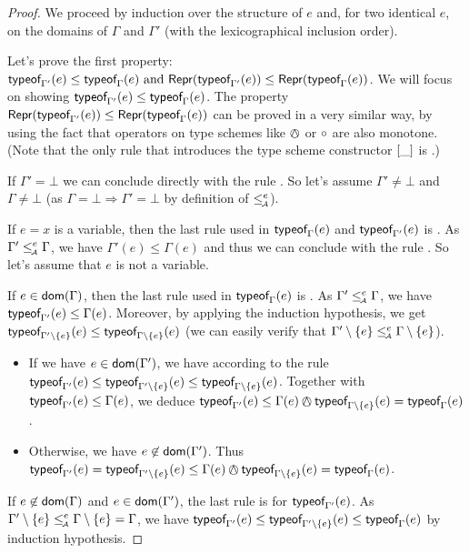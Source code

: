 \documentclass[a4paper]{article}
\theoremstyle{definition}
\begin{document}
  \begin{proof} 
  We proceed by induction over the structure of $e$
  and, for two identical $e$, on the domains of $\Gamma$ and $\Gamma'$ (with the lexicographical inclusion order).

  Let's prove the first property: $\textsf{typeof}_{\Gamma'}(e) \leq \textsf{typeof}_{\Gamma}(e) \text{ and } \textsf{Repr}(\textsf{typeof}_{\Gamma'}(e)) \leq \textsf{Repr}(\textsf{typeof}_{\Gamma}(e))$.
  We will focus on showing $\textsf{typeof}_{\Gamma'}(e) \leq \textsf{typeof}_{\Gamma}(e)$. The property $\textsf{Repr}(\textsf{typeof}_{\Gamma'}(e)) \leq \textsf{Repr}(\textsf{typeof}_{\Gamma}(e))$
  can be proved in a very similar way, by using the fact that operators on type schemes like $\tsand$ or $\circ$ are also monotone.
  (Note that the only rule that introduces the type scheme constructor ${[}\_]$ is .)

  If $\Gamma' = \bot$ we can conclude directly with the rule .
  So let's assume $\Gamma' \neq \bot$ and $\Gamma \neq \bot$
  (as $\Gamma = \bot \Rightarrow \Gamma' = \bot$ by definition of $\leq_{\!\scriptscriptstyle\mathcal{A}}^e$).

  If $e=x$ is a variable, then the last rule used in $\textsf{typeof}_{\Gamma}(e)$ and $\textsf{typeof}_{\Gamma'}(e)$ is .
  As $\Gamma' \leq_{\!\scriptscriptstyle\mathcal{A}}^e \Gamma$, we have $\Gamma'(e) \leq \Gamma(e)$ and thus
  we can conclude with the rule .
  So let's assume that $e$ is not a variable.

  If $e\in\textsf{dom}(\Gamma)$, then the last rule used in $\textsf{typeof}_{\Gamma}(e)$ is .
  As $\Gamma' \leq_{\!\scriptscriptstyle\mathcal{A}}^e \Gamma$, we have $\textsf{typeof}_{\Gamma'}(e) \leq \Gamma(e)$.
  Moreover, by applying the induction hypothesis, we get $\textsf{typeof}_{\Gamma'\setminus \{e\}}(e) \leq \textsf{typeof}_{\Gamma\setminus \{e\}}(e)$
  (we can easily verify that $\Gamma'\setminus\{e\} \leq_{\!\scriptscriptstyle\mathcal{A}}^e \Gamma\setminus\{e\}$).
  \begin{itemize}
    \item If we have $e\in\textsf{dom}(\Gamma')$, we have according to the rule 
    $\textsf{typeof}_{\Gamma'}(e) \leq \textsf{typeof}_{\Gamma'\setminus \{e\}}(e) \leq \textsf{typeof}_{\Gamma\setminus \{e\}}(e)$.
    Together with $\textsf{typeof}_{\Gamma'}(e) \leq \Gamma(e)$,
    we deduce $\tyof e {\Gamma'} \leq \Gamma(e) \tsand \tyof e {\Gamma\setminus \{e\}} = \tyof e {\Gamma}$.
    \item  Otherwise, we have $e\not\in\textsf{dom}(\Gamma')$. Thus
    $\tyof e {\Gamma'} = \tyof e {\Gamma'\setminus \{e\}} \leq \Gamma(e) \tsand \tyof e {\Gamma\setminus \{e\}}=\tyof e {\Gamma}$.
  \end{itemize}

  If $e\not\in\textsf{dom}(\Gamma)$ and $e\in\textsf{dom}(\Gamma')$, the last rule is  for $\textsf{typeof}_{\Gamma'}(e)$.
  As $\Gamma'\setminus\{e\} \leq_{\!\scriptscriptstyle\mathcal{A}}^e \Gamma\setminus\{e\} = \Gamma$,
  we have $\textsf{typeof}_{\Gamma'}(e) \leq \textsf{typeof}_{\Gamma'\setminus \{e\}}(e) \leq \textsf{typeof}_{\Gamma}(e)$ by induction hypothesis.


\end{proof}
\end{document}
